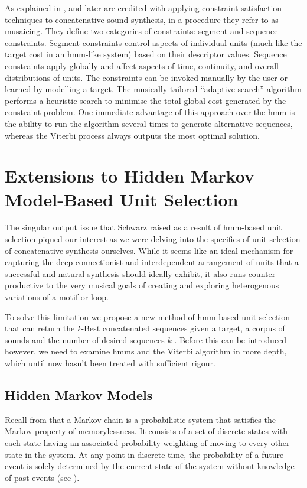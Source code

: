 {{{{{{{As explained in , \cite{Zils2001} and later \cite{Aucouturier2006} are credited with applying constraint satisfaction techniques to concatenative sound synthesis, in a procedure they refer to as musaicing. They define two categories of constraints: segment and sequence constraints. Segment constraints control aspects of individual units (much like the target cost in an \acrshort{hmm}-like system) based on their descriptor values. Sequence constraints apply globally and affect aspects of time, continuity, and overall distributions of units. The constraints can be invoked manually by the user or learned by modelling a target. The musically tailored “adaptive search” algorithm performs a heuristic search to minimise the total global cost generated by the constraint problem. One immediate advantage of this approach over the \acrshort{hmm} is the ability to run the algorithm several times to generate alternative sequences, whereas the Viterbi process always outputs the most optimal solution. 

\section{Extensions to Hidden Markov Model-Based Unit Selection}

The singular output issue that Schwarz raised as a result of \acrshort{hmm}-based unit selection piqued our interest as we were delving into the specifics of unit selection  of concatenative synthesis ourselves. While it seems like an ideal mechanism for capturing the deep connectionist and interdependent arrangement of units that a successful and natural synthesis should ideally exhibit, it also runs counter productive to the very musical goals of creating and exploring heterogenous variations of a motif or loop.

To solve this limitation we propose a new method of \acrshort{hmm}-based unit selection that can return the \textit{k}-Best concatenated sequences given a target, a corpus of sounds and the number of desired sequences $k$ \citep{Nuanain2017}. Before this can be introduced however, we need to examine \acrshort{hmm}s and the Viterbi algorithm in more depth, which until now hasn't been treated with sufficient rigour. 

\subsection{Hidden Markov Models}

Recall from  that a Markov chain is a probabilistic system that satisfies the Markov property of memorylessness. It consists of a set of discrete states with each state having an associated probability weighting of moving to every other state in the system. At any point in discrete time, the probability of a future event is solely determined by the current state of the system without knowledge of past events (see ).

}}}}}}}
